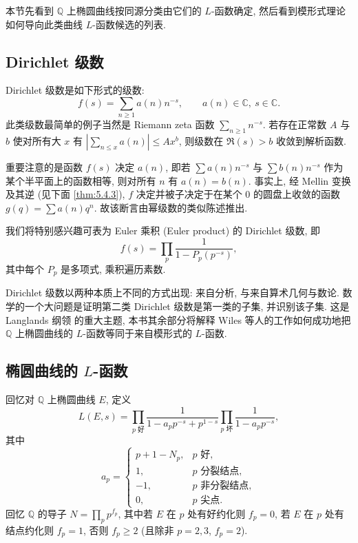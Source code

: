 本节先看到 $\mathbb{Q}$ 上椭圆曲线按同源分类由它们的 $L$-函数确定, 然后看到模形式理论如何导向此类曲线 $L$-函数候选的列表.

\subsection*{Dirichlet 级数}

Dirichlet 级数是如下形式的级数:
\[
f(s) = \sum_{n\ge 1}a(n)n^{-s}, \qquad a(n)\in\mathbb{C}, \ s\in\mathbb{C}.
\]
此类级数最简单的例子当然是 Riemann zeta 函数 $\sum_{n\ge 1}n^{-s}$. 若存在正常数 $A$ 与 $b$ 使对所有大 $x$ 有 $|\sum_{n\le x}a(n)|\le Ax^b$, 则级数在 $\Re(s) > b$ 收敛到解析函数.

重要注意的是函数 $f(s)$ 决定 $a(n)$, 即若 $\sum a(n)n^{-s}$ 与 $\sum b(n)n^{-s}$ 作为某个半平面上的函数相等, 则对所有 $n$ 有 $a(n) = b(n)$. 事实上, 经 Mellin 变换及其逆 (见下面 \ref{thm:5.4.3}), $f$ 决定并被子决定于在某个 $0$ 的圆盘上收敛的函数 $g(q) = \sum a(n)q^n$. 故该断言由幂级数的类似陈述推出.

我们将特别感兴趣可表为 Euler 乘积 (Euler product) 的 Dirichlet 级数, 即
\[
f(s) = \prod_p\frac{1}{1-P_p(p^{-s})},
\]
其中每个 $P_p$ 是多项式, 乘积遍历素数.

Dirichlet 级数以两种本质上不同的方式出现: 来自分析, 与来自算术几何与数论. 数学的一个大问题是证明第二类 Dirichlet 级数是第一类的子集, 并识别该子集. 这是 Langlands 纲领 的重大主题, 本书其余部分将解释 Wiles 等人的工作如何成功地把 $\mathbb{Q}$ 上椭圆曲线的 $L$-函数等同于来自模形式的 $L$-函数.

\subsection*{椭圆曲线的 $L$-函数}

回忆对 $\mathbb{Q}$ 上椭圆曲线 $E$, 定义
\[
L(E, s) = \prod_{p\text{ 好}}\frac{1}{1-a_pp^{-s} + p^{1-s}}\prod_{p\text{ 坏}}\frac{1}{1-a_pp^{-s}},
\]
其中
\[
a_p = \begin{cases} p + 1 - N_p, & p \text{ 好},\\ 1, & p \text{ 分裂结点},\\ -1, & p \text{ 非分裂结点},\\ 0, & p \text{ 尖点}. \end{cases}
\]
回忆 $\mathbb{Q}$ 的导子 $N = \prod_p p^{f_p}$, 其中若 $E$ 在 $p$ 处有好约化则 $f_p = 0$, 若 $E$ 在 $p$ 处有结点约化则 $f_p = 1$, 否则 $f_p\ge 2$ (且除非 $p = 2, 3$, $f_p = 2$).


